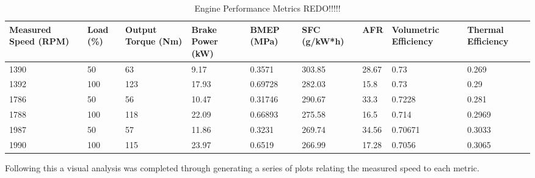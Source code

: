 \documentclass[12pt]{article}
\begin{document}
\begin{table}[H]
\centering
\begin{adjustwidth}{-3cm}{-3cm}
\caption{Engine Performance Metrics REDO!!!!!}
\label{Table:Raw_Data}
\begin{tabularx}{1.47\textwidth}{|X|X|X|X|X|X|X|X|X|}
\hline
Measured Speed (RPM) & Load (\%) & Output Torque (Nm) & Brake Power (kW) & BMEP (MPa) & SFC (g/kW*h) & AFR    & Volumetric Efficiency & Thermal Efficiency  \\ \hline
1390                 & 50        & 63                 & 9.17             & 0.3571     & 303.85       & 28.67  & 0.73                  & 0.269               \\ \hline
1392                 & 100       & 123                & 17.93            & 0.69728    & 282.03       & 15.8   & 0.73                  & 0.29                \\ \hline
1786                 & 50        & 56                 & 10.47            & 0.31746    & 290.67       & 33.3   & 0.7228                & 0.281               \\ \hline
1788                 & 100       & 118                & 22.09            & 0.66893    & 275.58       & 16.5   & 0.714                 & 0.2969              \\ \hline
1987                 & 50        & 57                 & 11.86            & 0.3231     & 269.74       & 34.56  & 0.70671               & 0.3033              \\ \hline
1990                 & 100       & 115                & 23.97            & 0.6519     & 266.99       & 17.28  & 0.7056                & 0.3065              \\ \hline
\end{tabularx}
\end{adjustwidth}
\end{table}
Following this a visual analysis was completed through generating a series of plots relating the measured speed to each metric.
\end{document}
